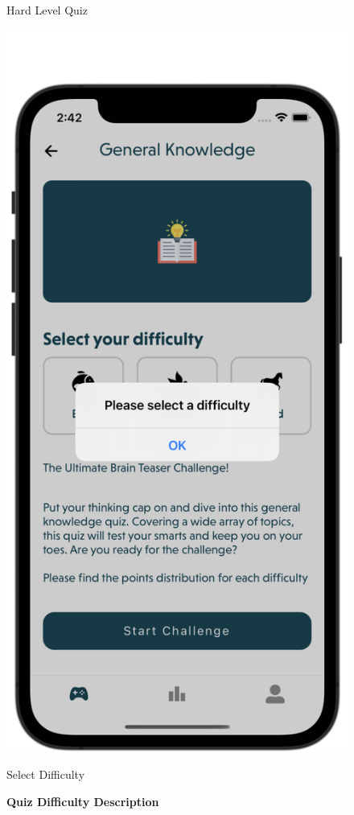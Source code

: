 \begin{figure}[H]
\begin{minipage}[b]{0.43\linewidth}
        \caption{Hard Level Quiz}
    \end{minipage}
    \hspace{0.1\linewidth}
    \begin{minipage}[b]{0.43\linewidth}
        \centering
        \includegraphics[width=\linewidth]{Mobile UI/Select Difficulty.png}
        \caption{Select Difficulty}
    \end{minipage}
    \vspace{0.5cm}
    \caption{\textbf{Quiz Difficulty Description}}
\end{figure}


